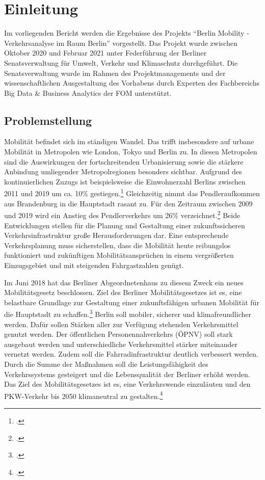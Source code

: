 \section{Einleitung}
Im vorliegenden Bericht werden die Ergebnisse des Projekts \enquote{Berlin Mobility - Verkehrsanalyse im Raum Berlin} vorgestellt. Das Projekt wurde zwischen Oktober 2020 und Februar 2021 unter Federführung der Berliner Senatsverwaltung für Umwelt, Verkehr und Klimaschutz durchgeführt. Die Senatsverwaltung wurde im Rahmen des Projektmanagements und der wissenschaftlichen Ausgestaltung des Vorhabens durch Experten des Fachbereichs Big Data \& Business Analytics der \ac{FOM} unterstützt.

\subsection{Problemstellung}\label{problems}
Mobilität befindet sich im ständigen Wandel. Das trifft insbesondere auf urbane Mobilität in Metropolen wie London, Tokyo und Berlin zu. In diesen Metropolen sind die Auswirkungen der fortschreitenden Urbanisierung sowie die stärkere Anbindung umliegender Metropolregionen besonders sichtbar. Aufgrund des kontinuierlichen Zuzugs ist beispielsweise die Einwohnerzahl Berlins zwischen 2011 und 2019 um ca. 10\% gestiegen.\footcite{Statista.2020} Gleichzeitig nimmt das Pendleraufkommen aus Brandenburg in die Hauptstadt rasant zu. Für den Zeitraum zwischen 2009 und 2019 wird ein Anstieg des Pendlerverkehrs um 26\% verzeichnet.\footcite{VBB-Pendlerblatt.2020}
Beide Entwicklungen stellen für die Planung und Gestaltung einer zukunftssicheren Verkehrsinfrastruktur große Herausforderungen dar. Eine entsprechende Verkehrsplanung muss sicherstellen, dass die Mobilität heute reibungslos funktioniert und zukünftigen Mobilitätsansprüchen in einem vergrößerten Einzugsgebiet und mit steigenden Fahrgastzahlen genügt.

Im Juni 2018 hat das Berliner Abgeordnetenhaus zu diesem Zweck ein neues Mobilitätsgesetz beschlossen. Ziel des Berliner Mobilitätsgesetzes ist es, eine belastbare Grundlage zur Gestaltung einer zukunftsfähigen urbanen Mobilität für die Hauptstadt zu schaffen.\footcite{Mobilitaetsgesetz.2020} Berlin soll mobiler, sicherer und klimafreundlicher werden. Dafür sollen Stärken aller zur Verfügung stehenden Verkehrsmittel genutzt werden. Der öffentlichen Personennahverkehrs (ÖPNV) soll stark ausgebaut werden und unterschiedliche Verkehrsmittel stärker miteinander vernetzt werden. Zudem soll die Fahrradinfrastruktur deutlich verbessert werden. Durch die Summe der Maßnahmen soll die Leistungsfähigkeit des Verkehrssystems gesteigert und die Lebensqualität der Berliner erhöht werden. Das Ziel des Mobilitätsgesetzes ist es, eine Verkehrswende einzuläuten und den PKW-Verkehr bis 2050 klimaneutral zu gestalten.\footcite{Mobilitaetsgesetz.2020}

